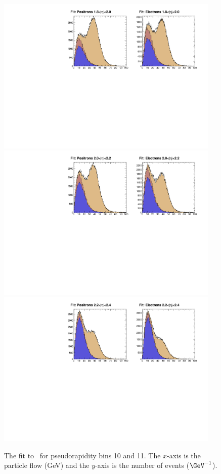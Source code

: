 \begin{figure}
\begin{center}
\includegraphics[width=0.95\textwidth]{data_8.pdf}
\includegraphics[width=0.95\textwidth]{data_9.pdf} \\
\includegraphics[width=0.95\textwidth]{data_10.pdf}
\caption[The fit to \MET for pseudorapidity bins 9,10 and 11.]
{\label{fig:data4} The fit to \MET\ for pseudorapidity bins 10 and
11.  The $x$-axis is the particle flow \ETm (GeV) and the $y$-axis is the number
of events ($\GeV^{-1}$).}
\end{center}
\end{figure}

